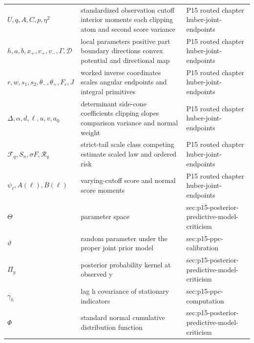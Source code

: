 \begin{longtable}{@{}p{}p{}p{}@{}}
\(U,\allowbreak q,\allowbreak A,\allowbreak C,\allowbreak p,\allowbreak \eta^2\) & standardized observation cutoff interior moments each clipping atom and second score variance & P15 routed chapter huber-\allowbreak{}joint-\allowbreak{}endpoints \\
\(h,\allowbreak a,\allowbreak b,\allowbreak x_+,\allowbreak v_+,\allowbreak v_-,\allowbreak \Gamma,\allowbreak \mathcal D\) & local parameters positive part boundary directions convex potential and directional map & P15 routed chapter huber-\allowbreak{}joint-\allowbreak{}endpoints \\
\(r,\allowbreak w,\allowbreak s_1,\allowbreak s_2,\allowbreak \theta_-,\allowbreak \theta_+,\allowbreak F_c,\allowbreak J\) & worked inverse coordinates scales angular endpoints and integral primitives & P15 routed chapter huber-\allowbreak{}joint-\allowbreak{}endpoints \\
\(\Delta,\allowbreak \alpha,\allowbreak d,\allowbreak \ell,\allowbreak u,\allowbreak v,\allowbreak a_0\) & determinant side-cone coefficients clipping slopes comparison variance and normal weight & P15 routed chapter huber-\allowbreak{}joint-\allowbreak{}endpoints \\
\(\mathcal F_q,\allowbreak S_n,\allowbreak \sigma F,\allowbreak \mathcal R_q\) & strict-tail scale class competing estimate scaled law and ordered risk & P15 routed chapter huber-\allowbreak{}joint-\allowbreak{}endpoints \\
\(\psi_\ell,\allowbreak A(\ell),\allowbreak B(\ell)\) & varying-cutoff score and normal score moments & P15 routed chapter huber-\allowbreak{}joint-\allowbreak{}endpoints \\
\(\Theta\) & parameter space & sec:\allowbreak{}p15-\allowbreak{}posterior-\allowbreak{}predictive-\allowbreak{}model-\allowbreak{}criticism \\
\(\vartheta\) & random parameter under the proper joint prior model & sec:\allowbreak{}p15-\allowbreak{}ppc-\allowbreak{}calibration \\
\(\Pi_y\) & posterior probability kernel at observed y & sec:\allowbreak{}p15-\allowbreak{}posterior-\allowbreak{}predictive-\allowbreak{}model-\allowbreak{}criticism \\
\(\gamma_h\) & lag h covariance of stationary indicators & sec:\allowbreak{}p15-\allowbreak{}ppc-\allowbreak{}computation \\
\(\Phi\) & standard normal cumulative distribution function & sec:\allowbreak{}p15-\allowbreak{}posterior-\allowbreak{}predictive-\allowbreak{}model-\allowbreak{}criticism \\

\end{longtable}
